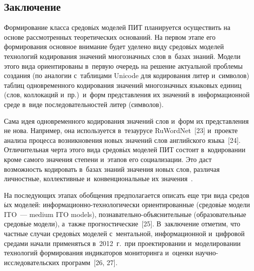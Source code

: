 \begin{multicols}{2}
\section{Заключение}

  Формирование класса средов$\acute{\mbox{ы}}$х моделей ПИТ 
планируется осуществить на основе рассмотренных теоретических 
оснований. На первом этапе его формирования основное внимание будет 
уделено виду средов$\acute{\mbox{ы}}$х моделей технологий кодирования 
значений многозначных слов в~базах знаний. Модели этого вида 
ориентированы в~первую очередь на решение актуальной проблемы 
создания (по аналогии с~таб\-ли\-ца\-ми Unicode для кодирования литер 
и~символов) таб\-лиц одновременного кодирования значений многозначных 
языковых единиц (слов, коллокаций и~пр.)\ и~форм представления их 
значений в~информационной среде в~виде последовательностей литер 
(символов).
  
  Сама идея одновременного кодирования значений слов и~форм их 
представления не нова. Например, она используется в~тезаурусе 
RuWordNet~[23] и~проекте анализа процесса возникновения новых значений 
слов английского языка~[24]. Отличительная черта этого вида 
средов$\acute{\mbox{ы}}$х моделей ПИТ состоит в~кодировании кроме 
самого значения степени и~этапов его социализации. Это даст возможность 
кодировать в~базах знаний значения новых слов, различая личностные, 
коллективные и~конвенциональные их  
значения~\cite{14-zac, 17-zac, 19-zac, 20-zac, 21-zac}.
  
  На последующих этапах обобщения предполагается описать еще три вида 
средов$\acute{\mbox{ы}}$х моделей: информационно-технологически 
ориентированные (средов$\acute{\mbox{ы}}$е модели ITO~--- medium ITO 
models), познавательно-объяснительные (образовательные 
средов$\acute{\mbox{ы}}$е модели), а~также прогностические~[25]. 
В~заключение отметим, что частные случаи средов$\acute{\mbox{ы}}$х 
моделей с~ментальной, информационной и~цифровой средами начали 
применяться в~2012~г.\ при проектировании и~моделировании технологий 
формирования индикаторов мониторинга и~оценки на\-уч\-но-ис\-сле\-до\-ва\-тель\-ских программ~[26, 27].
  

\end{multicols}
